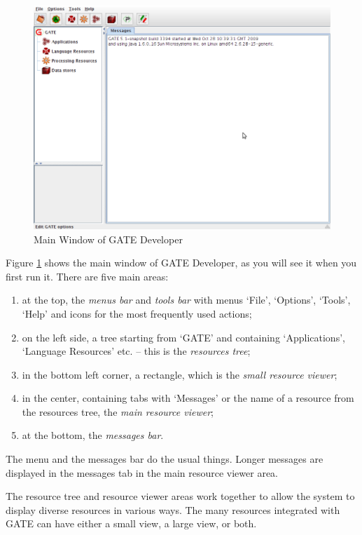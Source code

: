 %
\begin{figure}[!htb]
\begin{center}
\includegraphics[width=14cm]{developer-clean-start.png}
\end{center}
\caption{Main Window of GATE Developer}
\label{fig:mainWindow1}
\end{figure}
%
Figure \ref{fig:mainWindow1} shows the main window of GATE Developer, as you
will see it when you first run it. There are five main areas:
%
\begin{enumerate}
\item\label{item:menubar}
at the top, the {\em menus bar} and {\em tools bar} with menus `File',
`Options', `Tools', `Help' and icons for the most frequently used actions;
\item\label{item:resourcetree}
on the left side, a tree starting from `GATE' and containing
`Applications', `Language Resources' etc. -- this is the {\em resources tree};
\item\label{item:smallresview}
in the bottom left corner, a rectangle, which is the {\em small resource
viewer};
\item\label{item:mainresview}
in the center, containing tabs with `Messages' or the name
of a resource from the resources tree, the {\em main resource viewer};
\item\label{item:messagebar}
at the bottom, the {\em messages bar}.
\end{enumerate}
%
The menu and the messages bar do the usual things. Longer messages are
displayed in the messages tab in the main resource viewer area.

The resource tree and resource viewer areas work together to allow the system
to display diverse resources in various ways. The many resources integrated
with GATE can have either a small view, a large view, or both.

